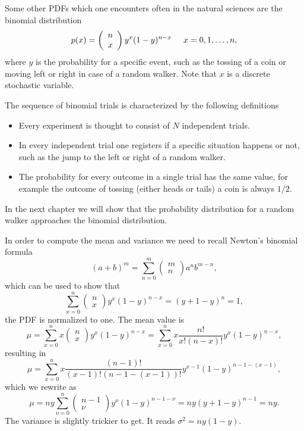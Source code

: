 Some other PDFs which one encounters often in the natural sciences are the binomial distribution
\[
   p(x) = \left(\begin{array}{c} n \\ x\end{array}\right)y^x(1-y)^{n-x} \hspace{0.5cm}x=0,1,\dots,n,
\]
where $y$ is the probability for a specific event, such as the tossing of a coin or moving left or right
in case of a random walker. Note that $x$ is a discrete stochastic variable. 
 
The sequence of binomial trials is characterized by the following definitions
\begin{svgraybox}
\begin{itemize}
\item Every experiment is thought to consist of $N$ independent trials.
\item In every independent trial one registers if a specific situation happens or not, such as the 
      jump to the left or right of a random walker.
\item The probability for every outcome in a single trial has the same value, for example the outcome of
tossing (either heads or tails) a coin is always $1/2$.
\end{itemize}
\end{svgraybox}
In the next chapter we will show that the probability distribution for a random
walker approaches the binomial distribution. 

In order to compute the mean and variance we need to recall Newton's binomial
formula
\[
   (a+b)^m=\sum_{n=0}^m \left(\begin{array}{c} m \\ n\end{array}\right)a^nb^{m-n},
\]
which can be used to show that
\[
\sum_{x=0}^n\left(\begin{array}{c} n \\ x\end{array}\right)y^x(1-y)^{n-x} = (y+1-y)^n = 1,
\]
the PDF is normalized to one. 
The mean value is
\[
\mu = \sum_{x=0}^n x\left(\begin{array}{c} n \\ x\end{array}\right)y^x(1-y)^{n-x} =
\sum_{x=0}^n x\frac{n!}{x!(n-x)!}y^x(1-y)^{n-x}, 
\]
resulting in
\[
\mu = 
\sum_{x=0}^n x\frac{(n-1)!}{(x-1)!(n-1-(x-1))!}y^{x-1}(1-y)^{n-1-(x-1)},
\]
which we rewrite as
\[
\mu=ny\sum_{\nu=0}^n\left(\begin{array}{c} n-1 \\ \nu\end{array}\right)y^{\nu}(1-y)^{n-1-\nu} =ny(y+1-y)^{n-1}=ny. 
\]
The variance is slightly trickier to get. It reads $\sigma^2=ny(1-y)$. 

